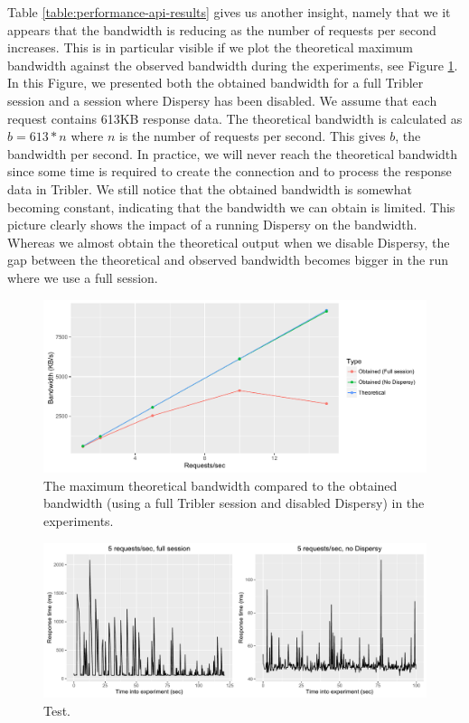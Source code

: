 Table \ref{table:performance-api-results} gives us another insight, namely that we it appears that the bandwidth is reducing as the number of requests per second increases. This is in particular visible if we plot the theoretical maximum bandwidth against the observed bandwidth during the experiments, see Figure \ref{fig:api-bandwidth-performance}. In this Figure, we presented both the obtained bandwidth for a full Tribler session and a session where Dispersy has been disabled. We assume that each request contains 613KB response data. The theoretical bandwidth is calculated as $ b = 613* n $ where $ n $ is the number of requests per second. This gives $ b $, the bandwidth per second. In practice, we will never reach the theoretical bandwidth since some time is required to create the connection and to process the response data in Tribler. We still notice that the obtained bandwidth is somewhat becoming constant, indicating that the bandwidth we can obtain is limited. This picture clearly shows the impact of a running Dispersy on the bandwidth. Whereas we almost obtain the theoretical output when we disable Dispersy, the gap between the theoretical and observed bandwidth becomes bigger in the run where we use a full session.

\begin{figure}[h!]
	\centering
	\includegraphics[width=1.0\columnwidth]{images/experiments/api_bandwidth_performance}
	\caption{The maximum theoretical bandwidth compared to the obtained bandwidth (using a full Tribler session and disabled Dispersy) in the experiments.}
	\label{fig:api-bandwidth-performance}
\end{figure}

\begin{figure}[h!]
	\centering
	\includegraphics[width=1.0\columnwidth]{images/experiments/request_times_comparison}
	\caption{Test.}
	\label{fig:api-performance}
\end{figure}

